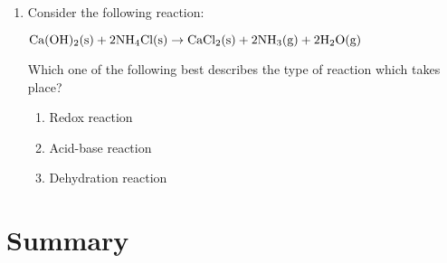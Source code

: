 {\begin{enumerate}
Is this reaction a substitution, addition or dehydration reaction? Give a reason for your answer.

\item{
Consider the following reaction:
\begin{center}
$\rm{Ca(OH)_{2}(s) + 2NH_{4}Cl (s) \rightarrow CaCl_{2}(s) + 2NH_{3}(g) + 2H_{2}O(g)}$
\end{center}

Which one of the following best describes the type of reaction which takes place?
		\begin{enumerate}
		\item{Redox reaction}
		\item{Acid-base reaction}
		\item{Dehydration reaction}
		\end{enumerate}
}
\end{enumerate}
}

\section{Summary}

